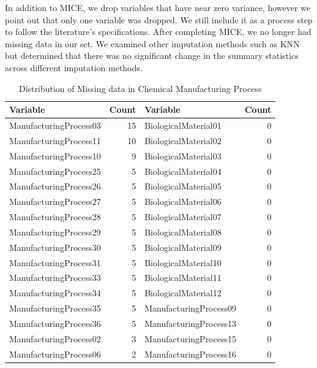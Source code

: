 \documentclass[]{report}
\begin{document}
In addition to MICE, we drop variables that have near zero variance,
however we point out that only one variable was dropped. We still
include it as a process step to follow the literature's specifications.
After completing MICE, we no longer had missing data in our set. We
examined other imputation methods such as KNN but determined that there
was no significant change in the summary statistics across different
imputation methods.

\begin{table}[H]

\caption{\label{tab:kj-6.3b}Distribution of Missing data in Chemical Manufacturing Process}
\centering
\begin{tabular}{l|r|l|r}
\hline
Variable & Count & Variable & Count\\
\hline
\rowcolor{gray!6}  ManufacturingProcess03 & 15 & BiologicalMaterial01 & 0\\
\hline
ManufacturingProcess11 & 10 & BiologicalMaterial02 & 0\\
\hline
\rowcolor{gray!6}  ManufacturingProcess10 & 9 & BiologicalMaterial03 & 0\\
\hline
ManufacturingProcess25 & 5 & BiologicalMaterial04 & 0\\
\hline
\rowcolor{gray!6}  ManufacturingProcess26 & 5 & BiologicalMaterial05 & 0\\
\hline
ManufacturingProcess27 & 5 & BiologicalMaterial06 & 0\\
\hline
\rowcolor{gray!6}  ManufacturingProcess28 & 5 & BiologicalMaterial07 & 0\\
\hline
ManufacturingProcess29 & 5 & BiologicalMaterial08 & 0\\
\hline
\rowcolor{gray!6}  ManufacturingProcess30 & 5 & BiologicalMaterial09 & 0\\
\hline
ManufacturingProcess31 & 5 & BiologicalMaterial10 & 0\\
\hline
\rowcolor{gray!6}  ManufacturingProcess33 & 5 & BiologicalMaterial11 & 0\\
\hline
ManufacturingProcess34 & 5 & BiologicalMaterial12 & 0\\
\hline
\rowcolor{gray!6}  ManufacturingProcess35 & 5 & ManufacturingProcess09 & 0\\
\hline
ManufacturingProcess36 & 5 & ManufacturingProcess13 & 0\\
\hline
\rowcolor{gray!6}  ManufacturingProcess02 & 3 & ManufacturingProcess15 & 0\\
\hline
ManufacturingProcess06 & 2 & ManufacturingProcess16 & 0\\

\end{tabular}
\end{table}
\end{document}
